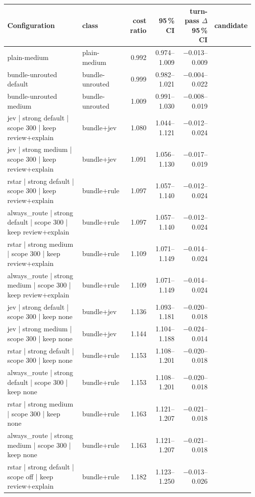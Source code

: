 \begin{tabular*}{\textwidth}{@{\extracolsep{\fill}}>{\raggedright\arraybackslash}p{} l r r r c@{}}
\toprule
Configuration & class & cost ratio & 95\,\% CI & turn-pass $\Delta$ 95\,\% CI & candidate \\
\midrule
plain-medium & plain-medium & 0.992 & 0.974--1.009 & $-$0.013--0.009 &  \\
bundle-unrouted default & bundle-unrouted & 0.999 & 0.982--1.021 & $-$0.004--0.022 &  \\
bundle-unrouted medium & bundle-unrouted & 1.009 & 0.991--1.030 & $-$0.008--0.019 &  \\
jev | strong default | scope 300 | keep review+explain & bundle+jev & 1.080 & 1.044--1.121 & $-$0.012--0.024 &  \\
jev | strong medium | scope 300 | keep review+explain & bundle+jev & 1.091 & 1.056--1.130 & $-$0.017--0.019 &  \\
rstar | strong default | scope 300 | keep review+explain & bundle+rule & 1.097 & 1.057--1.140 & $-$0.012--0.024 &  \\
always\_route | strong default | scope 300 | keep review+explain & bundle+rule & 1.097 & 1.057--1.140 & $-$0.012--0.024 &  \\
rstar | strong medium | scope 300 | keep review+explain & bundle+rule & 1.109 & 1.071--1.149 & $-$0.014--0.024 &  \\
always\_route | strong medium | scope 300 | keep review+explain & bundle+rule & 1.109 & 1.071--1.149 & $-$0.014--0.024 &  \\
jev | strong default | scope 300 | keep none & bundle+jev & 1.136 & 1.093--1.181 & $-$0.020--0.018 &  \\
jev | strong medium | scope 300 | keep none & bundle+jev & 1.144 & 1.104--1.188 & $-$0.024--0.014 &  \\
rstar | strong default | scope 300 | keep none & bundle+rule & 1.153 & 1.108--1.201 & $-$0.020--0.018 &  \\
always\_route | strong default | scope 300 | keep none & bundle+rule & 1.153 & 1.108--1.201 & $-$0.020--0.018 &  \\
rstar | strong medium | scope 300 | keep none & bundle+rule & 1.163 & 1.121--1.207 & $-$0.021--0.018 &  \\
always\_route | strong medium | scope 300 | keep none & bundle+rule & 1.163 & 1.121--1.207 & $-$0.021--0.018 &  \\
rstar | strong default | scope off | keep review+explain & bundle+rule & 1.182 & 1.123--1.250 & $-$0.013--0.026 &  \\

\end{tabular*}

